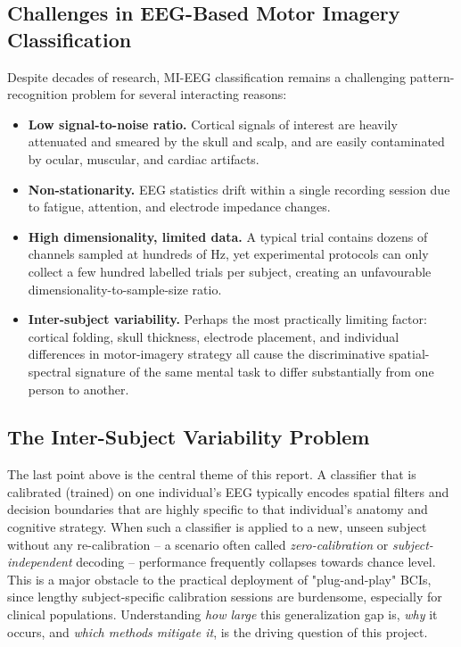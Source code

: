 \documentclass[11pt,a4paper]{article}
\begin{document}
\subsection{Challenges in EEG-Based Motor Imagery Classification}
Despite decades of research, MI-EEG classification remains a challenging pattern-recognition problem
for several interacting reasons:
\begin{itemize}[leftmargin=1.2cm]
    \item \textbf{Low signal-to-noise ratio.} Cortical signals of interest are heavily attenuated and
    smeared by the skull and scalp, and are easily contaminated by ocular, muscular, and cardiac
    artifacts.
    \item \textbf{Non-stationarity.} EEG statistics drift within a single recording session due to
    fatigue, attention, and electrode impedance changes.
    \item \textbf{High dimensionality, limited data.} A typical trial contains dozens of channels
    sampled at hundreds of Hz, yet experimental protocols can only collect a few hundred labelled
    trials per subject, creating an unfavourable dimensionality-to-sample-size ratio.
    \item \textbf{Inter-subject variability.} Perhaps the most practically limiting factor: cortical
    folding, skull thickness, electrode placement, and individual differences in motor-imagery
    strategy all cause the discriminative spatial-spectral signature of the same mental task to
    differ substantially from one person to another.
\end{itemize}

\subsection{The Inter-Subject Variability Problem}
The last point above is the central theme of this report. A classifier that is calibrated
(trained) on one individual's EEG typically encodes spatial filters and decision boundaries that are
highly specific to that individual's anatomy and cognitive strategy. When such a classifier is
applied to a new, unseen subject without any re-calibration -- a scenario often called
\emph{zero-calibration} or \emph{subject-independent} decoding -- performance frequently collapses
towards chance level. This is a major obstacle to the practical deployment of "plug-and-play" BCIs,
since lengthy subject-specific calibration sessions are burdensome, especially for clinical
populations. Understanding \emph{how large} this generalization gap is, \emph{why} it occurs, and
\emph{which methods mitigate it}, is the driving question of this project.
\end{document}
